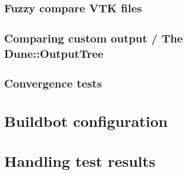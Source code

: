 \documentclass[11pt]{article}
\begin{document}
\subsection{Fuzzy compare VTK files}
\subsection{Comparing custom output / The Dune::OutputTree}
\subsection{Convergence tests}

\section{Buildbot configuration}

\section{Handling test results}
\end{document}
